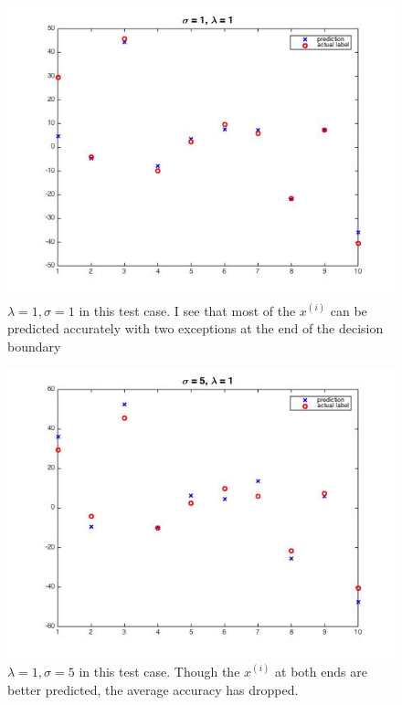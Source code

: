 \documentclass[twoside]{article}
\theoremstyle{definition}
\theoremstyle{definition}
\theoremstyle{remark}
\begin{document}
\begin{figure}[H]
\centering
\includegraphics[width=120mm]{problem1Pic2.jpg}
\caption{ $\lambda =1, \sigma = 1$ in this test case. I see that most of the $x^{(i)}$ can be predicted accurately with two exceptions at the end of the decision boundary   \label{problem1Pic2}}
\end{figure}

\begin{figure}[H]
\centering
\includegraphics[width=120mm]{problem1Pic3.jpg}
\caption{ $\lambda =1, \sigma = 5$ in this test case. Though the $x^{(i)}$ at both ends are better predicted, the average accuracy has dropped.    \label{problem1Pic2}}
\end{figure}
\end{document}
